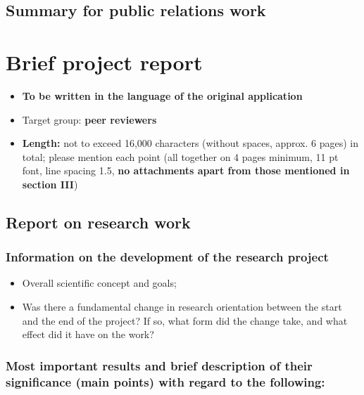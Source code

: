 \documentclass[a4paper, 11pt]{article}
\begin{document}
\subsection{Summary for public relations work}

\newpage
\section{Brief project report}
\setcounter{subsection}{0}

\begin{itemize}
\item \textbf{To be written in the language of the original application}
\item Target group:  \textbf{peer reviewers}
\item \textbf{Length:}  not to exceed 16,000 characters (without spaces, approx. 6 pages) in total; please
mention each point (all together on 4 pages minimum, 11 pt font, line spacing 1.5, \textbf{no attachments apart from those
mentioned in section III})
\end{itemize}

\subsection{Report on research work}

\subsubsection{Information on the development of the research project}

\begin{itemize}
\item Overall scientific concept and goals;
\item Was there a fundamental change in research orientation between the start and the
end of the project? If so, what form did the change take, and what effect did it
have on the work?
\end{itemize}

\subsubsection{Most important results and brief description of their significance (main
points) with regard to the following:}
\end{document}
